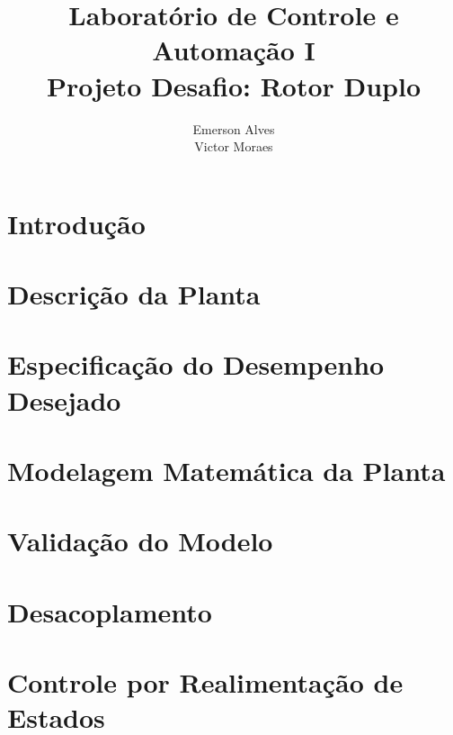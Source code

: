 \documentclass[journal]{IEEEtran}
\begin{document}
       
\title{\huge Laboratório de Controle e Automação I
	   \huge \\ Projeto Desafio: Rotor Duplo}

\author{Emerson Alves \\ Victor Moraes}

\maketitle

\begin{abstract}
	
\end{abstract}

\IEEEpeerreviewmaketitle

\section{Introdução}
	

\section{Descrição da Planta}\label{Sec:DescricaoPlanta}
	

\section{Especificação do Desempenho Desejado}\label{Sec:EspecifDesemp}
	

\section{Modelagem Matemática da Planta}\label{Sec:ModelagemPlanta}
	

\section{Validação do Modelo}\label{Sec:ValidacaoModelo}
	

\section{Desacoplamento}\label{Sec:Desacopla}
	

\section{Controle por Realimentação de Estados}\label{Sec:ControleEE}
	
\end{document}
